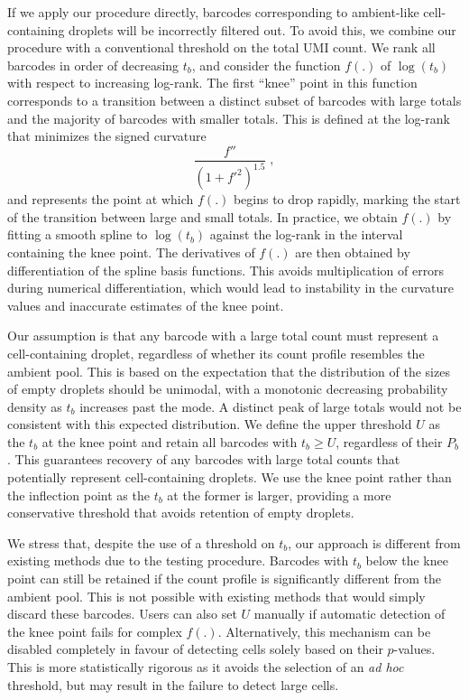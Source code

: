\documentclass[10pt,letterpaper]{article}
\begin{document}
If we apply our procedure directly, barcodes corresponding to ambient-like cell-containing droplets will be incorrectly filtered out.
To avoid this, we combine our procedure with a conventional threshold on the total UMI count.
We rank all barcodes in order of decreasing $t_b$, and consider the function $f(.)$ of $\log(t_b)$ with respect to increasing log-rank.
The first ``knee'' point in this function corresponds to a transition between a distinct subset of barcodes with large totals and the majority of barcodes with smaller totals.
This is defined at the log-rank that minimizes the signed curvature
\[
    \frac{f''}{(1 + f'^2)^{1.5}} \;,
\]
and represents the point at which $f(.)$ begins to drop rapidly, marking the start of the transition between large and small totals.
In practice, we obtain $f(.)$ by fitting a smooth spline to $\log(t_b)$ against the log-rank in the interval containing the knee point.
The derivatives of $f(.)$ are then obtained by differentiation of the spline basis functions.
This avoids multiplication of errors during numerical differentiation, which would lead to instability in the curvature values and inaccurate estimates of the knee point.

Our assumption is that any barcode with a large total count must represent a cell-containing droplet, regardless of whether its count profile resembles the ambient pool.
This is based on the expectation that the distribution of the sizes of empty droplets should be unimodal, with a monotonic decreasing probability density as $t_b$ increases past the mode.
A distinct peak of large totals would not be consistent with this expected distribution.
We define the upper threshold $U$ as the $t_b$ at the knee point and retain all barcodes with $t_b \ge U$, regardless of their $P_b$.
This guarantees recovery of any barcodes with large total counts that potentially represent cell-containing droplets. 
We use the knee point rather than the inflection point as the $t_b$ at the former is larger, providing a more conservative threshold that avoids retention of empty droplets.

We stress that, despite the use of a threshold on $t_b$, our approach is different from existing methods due to the testing procedure.
Barcodes with $t_b$ below the knee point can still be retained if the count profile is significantly different from the ambient pool.
This is not possible with existing methods that would simply discard these barcodes.
Users can also set $U$ manually if automatic detection of the knee point fails for complex $f(.)$.
Alternatively, this mechanism can be disabled completely in favour of detecting cells solely based on their $p$-values.
This is more statistically rigorous as it avoids the selection of an \textit{ad hoc} threshold, but may result in the failure to detect large cells.
\end{document}
